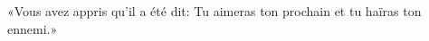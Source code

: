 \encetemps \jesusdisciples
	«Vous avez appris qu’il a été dit:
	Tu aimeras ton prochain et tu haïras ton ennemi.»

